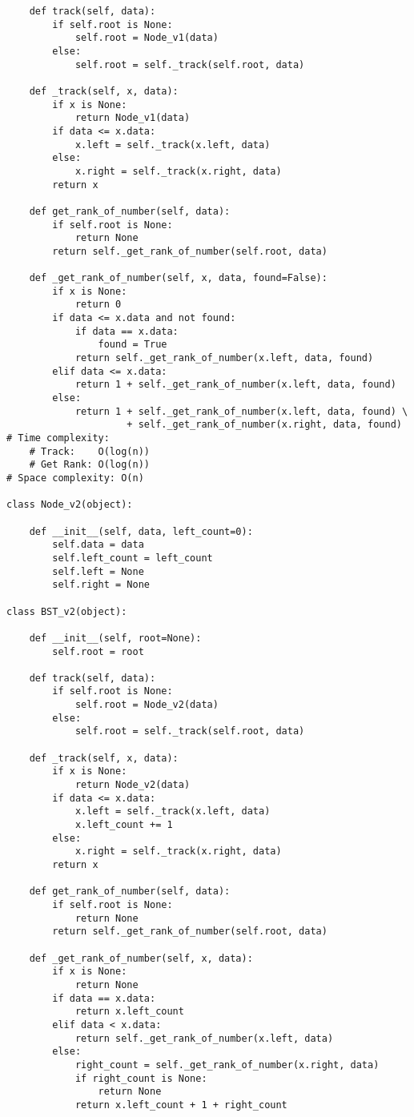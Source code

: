 \documentclass[12pt]{article}
\begin{document}
\begin{lstlisting}
    def track(self, data):
        if self.root is None:
            self.root = Node_v1(data)
        else:
            self.root = self._track(self.root, data)

    def _track(self, x, data):
        if x is None:
            return Node_v1(data)
        if data <= x.data:
            x.left = self._track(x.left, data)
        else:
            x.right = self._track(x.right, data)
        return x

    def get_rank_of_number(self, data):
        if self.root is None:
            return None
        return self._get_rank_of_number(self.root, data)

    def _get_rank_of_number(self, x, data, found=False):
        if x is None:
            return 0
        if data <= x.data and not found:
            if data == x.data:
                found = True
            return self._get_rank_of_number(x.left, data, found)
        elif data <= x.data:
            return 1 + self._get_rank_of_number(x.left, data, found)
        else:
            return 1 + self._get_rank_of_number(x.left, data, found) \
                     + self._get_rank_of_number(x.right, data, found)
# Time complexity:
    # Track:    O(log(n))
    # Get Rank: O(log(n))
# Space complexity: O(n)

class Node_v2(object):

    def __init__(self, data, left_count=0):
        self.data = data
        self.left_count = left_count
        self.left = None
        self.right = None

class BST_v2(object):

    def __init__(self, root=None):
        self.root = root

    def track(self, data):
        if self.root is None:
            self.root = Node_v2(data)
        else:
            self.root = self._track(self.root, data)

    def _track(self, x, data):
        if x is None:
            return Node_v2(data)
        if data <= x.data:
            x.left = self._track(x.left, data)
            x.left_count += 1
        else:
            x.right = self._track(x.right, data)
        return x

    def get_rank_of_number(self, data):
        if self.root is None:
            return None
        return self._get_rank_of_number(self.root, data)

    def _get_rank_of_number(self, x, data):
        if x is None:
            return None
        if data == x.data:
            return x.left_count
        elif data < x.data:
            return self._get_rank_of_number(x.left, data)
        else:
            right_count = self._get_rank_of_number(x.right, data)
            if right_count is None:
                return None
            return x.left_count + 1 + right_count



\end{lstlisting}
\end{document}
